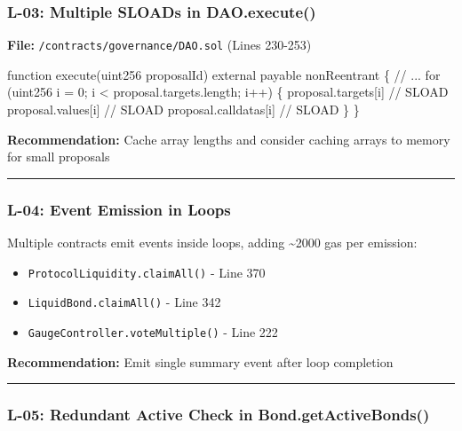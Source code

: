 \documentclass[
]{article}
\newenvironment{Shaded}{}{}
\newcommand{\NormalTok}[1]{#1}
\providecommand{\tightlist}{%
  \setlength{\itemsep}{0pt}\setlength{\parskip}{0pt}}
\begin{document}
\subsubsection{L-03: Multiple SLOADs in
DAO.execute()}\label{l-03-multiple-sloads-in-daoexecute}

\textbf{File:} \texttt{/contracts/governance/DAO.sol} (Lines 230-253)

\begin{Shaded}
\begin{Highlighting}[]
\NormalTok{function execute(uint256 proposalId) external payable nonReentrant \{}
\NormalTok{    // ...}
\NormalTok{    for (uint256 i = 0; i \textless{} proposal.targets.length; i++) \{}
\NormalTok{        proposal.targets[i]    // SLOAD}
\NormalTok{        proposal.values[i]     // SLOAD}
\NormalTok{        proposal.calldatas[i]  // SLOAD}
\NormalTok{    \}}
\NormalTok{\}}
\end{Highlighting}
\end{Shaded}

\textbf{Recommendation:} Cache array lengths and consider caching arrays
to memory for small proposals

\begin{center}\rule{0.5\linewidth}{0.5pt}\end{center}

\subsubsection{L-04: Event Emission in
Loops}\label{l-04-event-emission-in-loops}

Multiple contracts emit events inside loops, adding \textasciitilde2000
gas per emission:

\begin{itemize}
\tightlist
\item
  \texttt{ProtocolLiquidity.claimAll()} - Line 370
\item
  \texttt{LiquidBond.claimAll()} - Line 342
\item
  \texttt{GaugeController.voteMultiple()} - Line 222
\end{itemize}

\textbf{Recommendation:} Emit single summary event after loop completion

\begin{center}\rule{0.5\linewidth}{0.5pt}\end{center}

\subsubsection{L-05: Redundant Active Check in
Bond.getActiveBonds()}\label{l-05-redundant-active-check-in-bondgetactivebonds}
\end{document}

